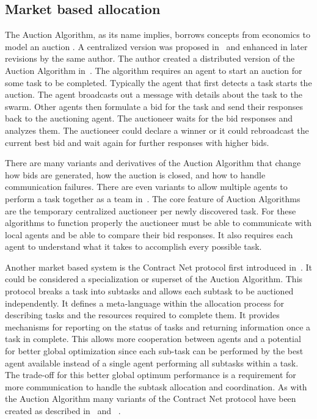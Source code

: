 \subsection{Market based allocation}

The Auction Algorithm, as its name implies, borrows concepts from economics to model an auction \parencite{auction_book}.  A centralized version was proposed in~\textcite{auction_derive} and enhanced in later revisions by the same author.  The author created a distributed version of the Auction Algorithm in~\textcite{auction_parallel}.  The algorithm requires an agent to start an auction for some task to be completed.  Typically the agent that first detects a task starts the auction.  The agent broadcasts out a message with details about the task to the swarm.  Other agents then formulate a bid for the task and send their responses back to the auctioning agent.  The auctioneer waits for the bid responses and analyzes them.  The auctioneer could declare a winner or it could rebroadcast the current best bid and wait again for further responses with higher bids.  

There are many variants and derivatives of the Auction Algorithm that change how bids are generated, how the auction is closed, and how to handle communication failures.  There are even variants to allow multiple agents to perform a task together as a team in~\textcite{auction_team}.  The core feature of Auction Algorithms are the temporary centralized auctioneer per newly discovered task.  For these algorithms to function properly the auctioneer must be able to communicate with local agents and be able to compare their bid responses.  It also requires each agent to understand what it takes to accomplish every possible task.

Another market based system is the Contract Net protocol first introduced in~\textcite{contract_net}.  It could be considered a specialization or superset of the Auction Algorithm.  This protocol breaks a task into subtasks and allows each subtask to be auctioned independently. It defines a meta-language within the allocation process for describing tasks and the resources required to complete them.  It provides mechanisms for reporting on the status of tasks and returning information once a task in complete.  This allows more cooperation between agents and a potential for better global optimization since each sub-task can be performed by the best agent available instead of a single agent performing all subtasks within a task.  The trade-off for this better global optimum performance is a requirement for more communication to handle the subtask allocation and coordination.  As with the Auction Algorithm many variants of the Contract Net protocol have been created as described in~\textcite{contract_survey} and ~\textcite{contract_equity}.

